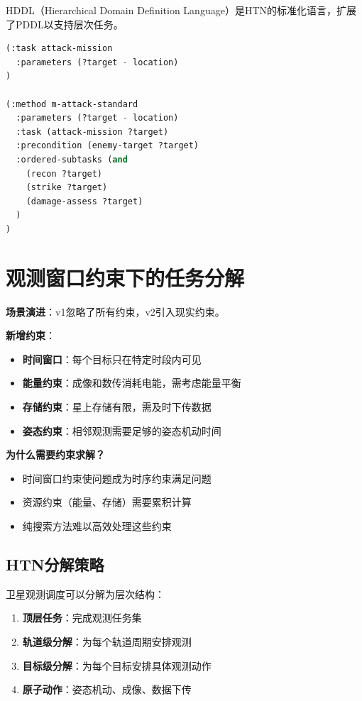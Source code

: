 HDDL（Hierarchical Domain Definition Language）是HTN的标准化语言，扩展了PDDL以支持层次任务。

\begin{lstlisting}[language=Lisp,caption=HDDL任务定义示例]
(:task attack-mission
  :parameters (?target - location)
)

(:method m-attack-standard
  :parameters (?target - location)
  :task (attack-mission ?target)
  :precondition (enemy-target ?target)
  :ordered-subtasks (and
    (recon ?target)
    (strike ?target)
    (damage-assess ?target)
  )
)
\end{lstlisting}

\section{观测窗口约束下的任务分解}

\begin{caseboxA}
\textbf{场景演进}：v1忽略了所有约束，v2引入现实约束。

\textbf{新增约束}：
\begin{itemize}
  \item \textbf{时间窗口}：每个目标只在特定时段内可见
  \item \textbf{能量约束}：成像和数传消耗电能，需考虑能量平衡
  \item \textbf{存储约束}：星上存储有限，需及时下传数据
  \item \textbf{姿态约束}：相邻观测需要足够的姿态机动时间
\end{itemize}

\textbf{为什么需要约束求解？}
\begin{itemize}
  \item 时间窗口约束使问题成为时序约束满足问题
  \item 资源约束（能量、存储）需要累积计算
  \item 纯搜索方法难以高效处理这些约束
\end{itemize}
\end{caseboxA}

\subsection{HTN分解策略}

卫星观测调度可以分解为层次结构：

\begin{enumerate}[leftmargin=2em]
  \item \textbf{顶层任务}：完成观测任务集
  \item \textbf{轨道级分解}：为每个轨道周期安排观测
  \item \textbf{目标级分解}：为每个目标安排具体观测动作
  \item \textbf{原子动作}：姿态机动、成像、数据下传
\end{enumerate}

